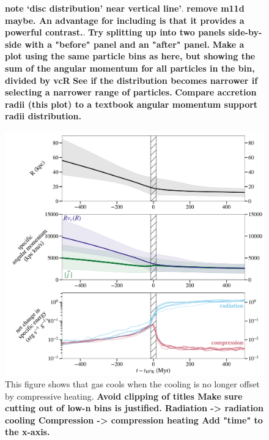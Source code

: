 \documentclass[fleqn,usenatbib]{mnras}
\begin{document}
\begin{figure}
{    \textbf{note `disc distribution' near vertical line'}.
    \textbf{remove m11d maybe. An advantage for including is that it provides a powerful contrast.}.
    \textbf{Try splitting up into two panels side-by-side with a "before" panel and an "after" panel.}
    \textbf{Make a plot using the same particle bins as here, but showing the sum of the angular momentum for all particles in the bin, divided by vcR}
    \textbf{See if the distribution becomes narrower if selecting a narrower range of particles.}
    \textbf{Compare accretion radii (this plot) to a textbook angular momentum support radii distribution.}
    }
    \label{f: theta vs R}
\end{figure}

\begin{figure}
\includegraphics[width=\columnwidth]{figures/rad_vs_compress.pdf}
\caption{
This figure shows that gas cools when the cooling is no longer offset by compressive heating.
\textbf{
Avoid clipping of titles
Make sure cutting out of low-n bins is justified.
Radiation -> radiation cooling
Compression -> compression heating
Add "time" to the x-axis.
}
}
\label{f:Edot}
\end{figure}
\end{document}
